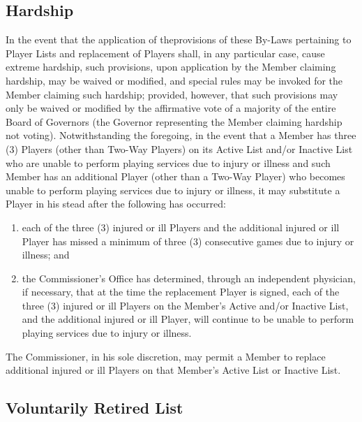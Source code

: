 \documentclass[]{book}
\providecommand{\tightlist}{%
  \setlength{\itemsep}{0pt}\setlength{\parskip}{0pt}}
\begin{document}
\hypertarget{hardship}{%
\subsection{Hardship}\label{hardship}}

In the event that the application of theprovisions of these By-Laws pertaining to Player Lists and replacement of Players shall, in any particular case, cause extreme hardship, such provisions, upon application by the Member claiming hardship, may be waived or modified, and special rules may be invoked for the Member claiming such hardship; provided, however, that such provisions may only be waived or modified by the affirmative vote of a majority of the entire Board of Governors (the Governor representing the Member claiming hardship not voting). Notwithstanding the foregoing, in the event that a Member has three (3) Players (other than Two-Way Players) on its Active List and/or Inactive List who are unable to perform playing services due to injury or illness and such Member has an additional Player (other than a Two-Way Player) who becomes unable to perform playing services due to injury or illness, it may substitute a Player in his stead after the following has occurred:

\begin{enumerate}
\def\labelenumi{(\alph{enumi})}
\tightlist
\item
  each of the three (3) injured or ill Players and the additional injured or ill Player has missed a minimum of three (3) consecutive games due to injury or illness; and
\item
  the Commissioner's Office has determined, through an independent physician, if necessary, that at the time the replacement Player is signed, each of the three (3) injured or ill Players on the Member's Active and/or Inactive List, and the additional injured or ill Player, will continue to be unable to perform playing services due to injury or illness.
\end{enumerate}

The Commissioner, in his sole discretion, may permit a Member to replace additional injured or ill Players on that Member's Active List or Inactive List.

\hypertarget{voluntarily-retired-list}{%
\subsection{Voluntarily Retired List}\label{voluntarily-retired-list}}
\end{document}
